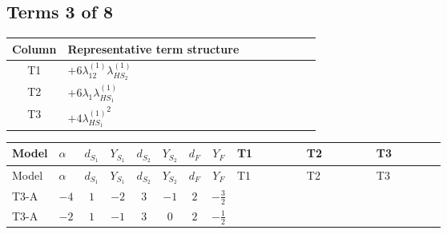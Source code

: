 \documentclass[8pt]{article}
\begin{document}
\begin{landscape}
\subsection*{Terms 3 of 8}
\begin{center}
\begin{tabular}{@{}c >{\raggedright\arraybackslash}p{0.82\linewidth}@{}}
\toprule
Column & Representative term structure \\
\midrule
T1 & \(\displaystyle +6 {\lambda_{12}^{(1)}} {\lambda_{HS_2}^{(1)}}\) \\
\midrule
T2 & \(\displaystyle +6 {\lambda_1} {\lambda_{HS_1}^{(1)}}\) \\
\midrule
T3 & \(\displaystyle +4 {\lambda_{HS_1}^{(1)}}^2\) \\
\midrule
\bottomrule
\end{tabular}
\end{center}
\smallskip
\tiny
\begin{longtable}{@{}llcccccc >{\raggedright\arraybackslash}p{0.21\linewidth} >{\raggedright\arraybackslash}p{0.21\linewidth} >{\raggedright\arraybackslash}p{0.21\linewidth}@{}}
\toprule
Model & $\alpha$ & $d_{S_1}$ & $Y_{S_1}$ & $d_{S_2}$ & $Y_{S_2}$ & $d_F$ & $Y_F$ & T1 & T2 & T3 \\
\midrule
\endfirsthead
\toprule
Model & $\alpha$ & $d_{S_1}$ & $Y_{S_1}$ & $d_{S_2}$ & $Y_{S_2}$ & $d_F$ & $Y_F$ & T1 & T2 & T3 \\
\midrule
\endhead
T3-A & $-4$ & $1$ & $-2$ & $3$ & $-1$ & $2$ & $-\frac{3}{2}$ & \scriptsize\adjustbox{max width=\linewidth}{$\begin{gathered} +6 {\lambda_{12}^{(1)}} {\lambda_{HS_2}^{(1)}}\end{gathered}$} & \scriptsize\adjustbox{max width=\linewidth}{$\begin{gathered} +6 {\lambda_1} {\lambda_{HS_1}^{(1)}}\end{gathered}$} & \scriptsize\adjustbox{max width=\linewidth}{$\begin{gathered} +4 {\lambda_{HS_1}^{(1)}}^2\end{gathered}$} \\
\midrule
T3-A & $-2$ & $1$ & $-1$ & $3$ & $0$ & $2$ & $-\frac{1}{2}$ & \scriptsize\adjustbox{max width=\linewidth}{$\begin{gathered} +6 {\lambda_{12}^{(1)}} {\lambda_{HS_2}^{(1)}}\end{gathered}$} & \scriptsize\adjustbox{max width=\linewidth}{$\begin{gathered} +6 {\lambda_1} {\lambda_{HS_1}^{(1)}}\end{gathered}$} & \scriptsize\adjustbox{max width=\linewidth}{$\begin{gathered} +4 {\lambda_{HS_1}^{(1)}}^2\end{gathered}$} \\

\end{longtable}
\end{landscape}
\end{document}
